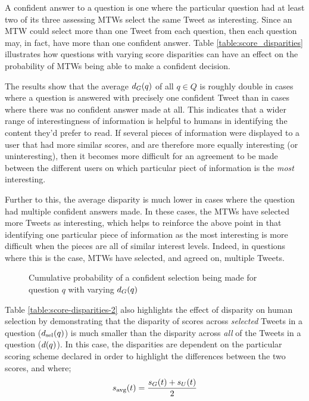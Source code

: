 A confident answer to a question is one where the particular question had at least two of its three assessing MTWs select the same Tweet as interesting. Since an MTW could select more than one Tweet from each question, then each question may, in fact, have more than one confident answer. Table \ref{table:score_disparities} illustrates how questions with varying score disparities can have an effect on the probability of MTWs being able to make a confident decision.

The results show that the average $d_G(q)$ of all $q \in Q$ is roughly double in cases where a question is answered with precisely one confident Tweet than in cases where there was no confident answer made at all. This indicates that a wider range of interestingness of information is helpful to humans in identifying the content they'd prefer to read. If several pieces of information were displayed to a user that had more similar scores, and are therefore more equally interesting (or uninteresting), then it becomes more difficult for an agreement to be made between the different users on which particular piect of information is the \textit{most} interesting.

Further to this, the average disparity is much lower in cases where the question had multiple confident answers made. In these cases, the MTWs have selected more Tweets as interesting, which helps to reinforce the above point in that identifying one particular piece of information as the most interesting is more difficult when the pieces are all of similar interest levels. Indeed, in questions where this is the case, MTWs have selected, and agreed on, multiple Tweets. 

 \begin{figure}[h]
\centering
{}
\caption{Cumulative probability of a confident selection being made for question $q$ with varying $d_G(q)$}
\label{fig:cum-question-disparity}
\end{figure}

Table \ref{table:score-disparities-2} also highlights the effect of disparity on human selection by demonstrating that the disparity of scores across \textit{selected} Tweets in a question ($d_{\textrm{sel}}(q)$) is much smaller than the disparity across \textit{all} of the Tweets in a question ($d(q)$). In this case, the disparities are dependent on the particular scoring scheme declared in order to highlight the differences between the two scores, and where;
\[
    s_{\textrm{avg}}(t) = \frac{s_G(t) + s_U(t)}{2}
\] 


